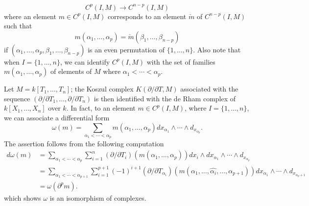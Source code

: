 \[C^p(I,M)\to C^{n-p}(I,M)\]
where an element $m\in C^p(I,M)$ corresponds to an element $\check{m}$ of $C^{n-p}(I,M)$ such that
\[m(\alpha_1,\dots,\alpha_p)=\check{m}(\beta_1,\dots,\beta_{n-p})\]
if $(\alpha_1,\dots,\alpha_p,\beta_1,\dots,\beta_{n-p})$ is an even permutation of $\{1,\dots,n\}$. Also note that when $I=\{1,\dots,n\}$, we can identify $C^p(I,M)$ with the set of families $m(\alpha_1,\dots,\alpha_p)$ of elements of $M$ where $\alpha_1<\cdots<\alpha_p$.
\begin{example}\label{Koszul complex and de Rham complex for polynomial ring}
Let $M=k[T_1,\dots,T_n]$; the Koszul complex $K(\partial/\partial T,M)$ associated with the sequence $(\partial/\partial T_1,\dots,\partial/\partial T_n)$ is then identified with the de Rham complex of $k[X_1,\dots,X_n]$ over $k$. In fact, to an element $m\in C^p(I,M)$, where $I=\{1,\dots,n\}$, we can associate a differential form
\[\omega(m)=\sum_{\alpha_1<\cdots<\alpha_p}m(\alpha_1,\dots,\alpha_p)dx_{\alpha_1}\wedge\cdots\wedge d_{x_{\alpha_p}}.\]
The assertion follows from the following computation
\begin{align*}
d\omega(m)&=\sum_{\alpha_1<\cdots<\alpha_p}\sum_{i=1}^{n}(\partial/\partial T_i)(m(\alpha_1,\dots,\alpha_p))dx_i\wedge dx_{\alpha_1}\wedge\cdots\wedge d_{x_{\alpha_p}}\\
&=\sum_{\alpha_1<\cdots<\alpha_{p+1}}\sum_{i=1}^{p+1}(-1)^{i+1}(\partial/\partial T_{\alpha_i})(m(\alpha_1,\dots,\widehat{\alpha_i},\dots,\alpha_{p+1}))dx_{\alpha_1}\wedge\cdots\wedge d_{x_{\alpha_p+1}}\\
&=\omega(\partial^pm).
\end{align*}
which shows $\omega$ is an isomorphism of complexes.
\end{example}
